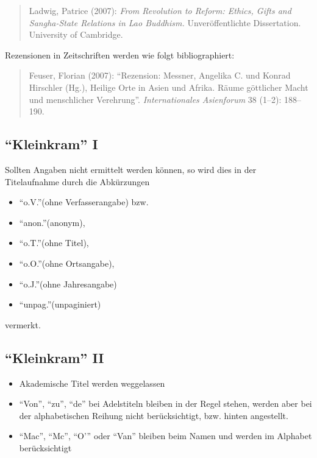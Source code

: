 \documentclass[ 12pt,
                titlepage,
                parskip=half,
                version=first,
                bibliography=totocnumbered,
                final,
                listof=totoc]{scrartcl}
\begin{document}
\begin{quote}
Ladwig, Patrice (2007): \emph{From Revolution to Reform: Ethics, Gifts and
Sangha-State Relations in Lao Buddhism.} Unveröffentlichte Dissertation.
University of Cambridge.
\end{quote}

Rezensionen in Zeitschriften werden wie folgt bibliographiert:

\begin{quote}
Feuser, Florian (2007): \enquote{Rezension: Messner, Angelika C.
und Konrad Hirschler (Hg.), Heilige Orte in Asien und Afrika. Räume göttlicher
Macht und menschlicher Verehrung}. \emph{Internationales Asienforum} 38 (1--2):
188--190.
\end{quote}

\subsection{\enquote{Kleinkram} I}
\label{sec:sub_kleinkram_1}

Sollten Angaben nicht ermittelt werden können, so wird dies in der Titelaufnahme
durch die Abkürzungen
\begin{itemize}
    \item[] \enquote{o.V.}(ohne Verfasserangabe) bzw.
    \item[] \enquote{anon.}(anonym),
    \item[] \enquote{o.T.}(ohne Titel),
    \item[] \enquote{o.O.}(ohne Ortsangabe),
    \item[] \enquote{o.J.}(ohne Jahresangabe)
    \item[] \enquote{unpag.}(unpaginiert)
\end{itemize}
vermerkt.

\subsection{\enquote{Kleinkram} II}
\label{sec:sub_kleinkram_2}

\begin{itemize}
    \item Akademische Titel werden weggelassen
    \item \enquote{Von}, \enquote{zu}, \enquote{de} bei Adelstiteln bleiben in
    der Regel stehen, werden aber bei der alphabetischen Reihung nicht
    berücksichtigt, bzw. hinten angestellt.
    \item \enquote{Mac}, \enquote{Mc}, \enquote{O'} oder \enquote{Van} bleiben
    beim Namen und werden im Alphabet berücksichtigt
\end{itemize}
\end{document}
